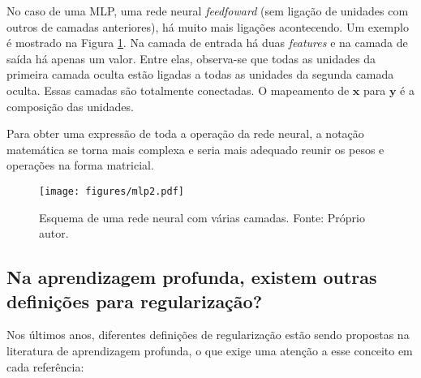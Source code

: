 No caso de uma MLP, uma rede neural \textit{feedfoward} (sem ligação de unidades com outros de camadas anteriores), há muito mais ligações acontecendo. Um exemplo é mostrado na Figura \ref{fig:my_MLP}. Na camada de entrada há duas \textit{features} e na camada de saída há apenas um valor. Entre elas, observa-se que todas as unidades da primeira camada oculta estão ligadas a todas as unidades da segunda camada oculta. Essas camadas são totalmente conectadas. O mapeamento de $\mathbf{x}$ para $\mathbf{y}$ é a composição das unidades. 

Para obter uma expressão de toda a operação da rede neural, a notação matemática se torna mais complexa e seria mais adequado reunir os pesos e operações na forma matricial. 
\begin{figure}[H]
\begin{center}
\texttt{[image: figures/mlp2.pdf]}
\caption[Esquema de uma rede neural com várias camadas. ]{Esquema de uma rede neural com várias camadas. Fonte: Próprio autor. }
\label{fig:my_MLP}
\end{center}
\end{figure}




\subsection{Na aprendizagem profunda, existem outras definições para regularização?}\label{sec:new}

Nos últimos anos, diferentes definições de regularização estão sendo propostas na literatura de aprendizagem profunda, o que exige uma atenção a esse conceito em cada referência:

